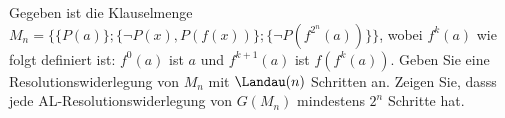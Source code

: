 
\begin{exercise}[186]

Gegeben ist die Klauselmenge $M_n = \{\{P(a)\};\{\neg P(x),P(f(x))\};\{\neg P(f^{2^n}(a))\}\}$,
wobei $f^k(a)$ wie folgt definiert ist: $f^0(a)$ ist $a$ und $f^{k+1}(a)$ ist $f(f^k(a))$.
Geben Sie eine Resolutionswiderlegung von $M_n$ mit $\Landau(n)$ Schritten an.
Zeigen Sie, dasss jede AL-Resolutionswiderlegung von $G(M_n)$ mindestens $2^n$
Schritte hat.

\end{exercise}


\begin{solution}

  \phantom{}

\end{solution}
